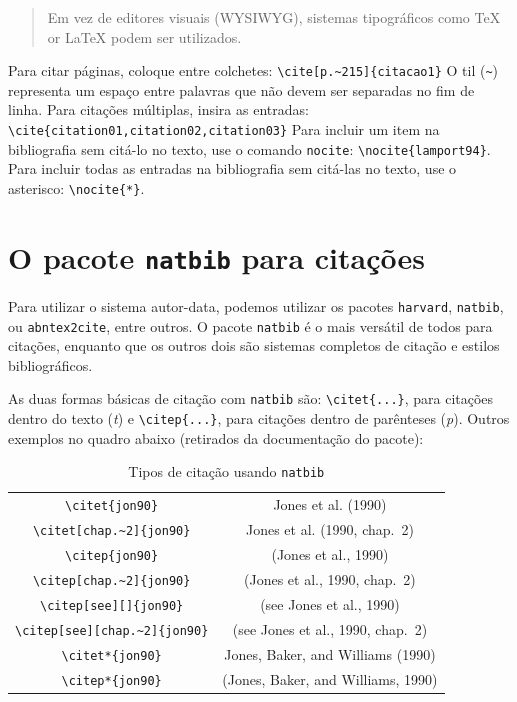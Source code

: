 \begin{quote}
Em vez de editores visuais (WYSIWYG), sistemas tipográficos como \TeX{} or \LaTeX{} \parencite{lamport94} podem ser utilizados.
\end{quote}

Para citar páginas, coloque entre colchetes:
\verb+\cite[p.~215]{citacao1}+
O til (\verb+~+) representa um espaço entre palavras que não devem ser separadas no fim de linha. 
Para citações múltiplas, insira as entradas:\newline
\verb+\cite{citation01,citation02,citation03}+
Para incluir um item na bibliografia sem citá-lo no texto, use o comando \texttt{nocite}: \verb+\nocite{lamport94}+. Para incluir todas as entradas na bibliografia sem citá-las no texto, use o asterisco: \verb+\nocite{*}+. 

\section{O pacote \texttt{natbib} para citações}
\label{natbib}
Para utilizar o sistema autor-data, podemos utilizar os pacotes \texttt{harvard}, \texttt{natbib}, ou \texttt{abn\-tex2\-ci\-te}, entre outros.
O pacote \texttt{natbib} é o mais versátil de todos para citações, enquanto que os outros dois são sistemas completos de citação e estilos bibliográficos.

As duas formas básicas de citação com \texttt{natbib} são: \verb+\citet{...}+, para citações dentro do texto (\textit{t}) e \verb+\citep{...}+, para citações dentro de parênteses (\textit{p}). Outros exemplos no quadro abaixo (retirados da documentação do pacote):


\begin{table}
\caption{\label{tab:natbib} Tipos de citação usando \texttt{natbib}}
\begin{tabular}{cc}
  \verb|\citet{jon90}| & Jones et al. (1990)\\
  \verb|\citet[chap.~2]{jon90}| & Jones et al. (1990, chap.~2)\\
  \verb|\citep{jon90}| & (Jones et al., 1990)\\
  \verb|\citep[chap.~2]{jon90}| & (Jones et al., 1990, chap.~2)\\
  \verb|\citep[see][]{jon90}| & (see Jones et al., 1990)\\
  \verb|\citep[see][chap.~2]{jon90}| & (see Jones et al., 1990, chap.~2)\\
  \verb|\citet*{jon90}| & Jones, Baker, and Williams (1990)\\
  \verb|\citep*{jon90}| & (Jones, Baker, and Williams, 1990)
\end{tabular}
\end{table}



